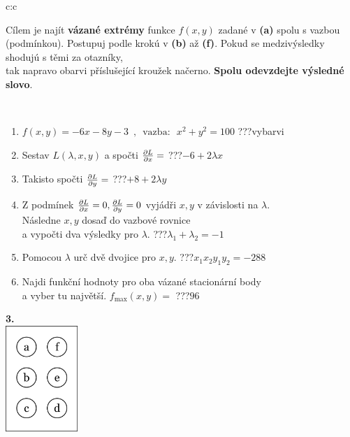 \documentclass[10pt]{report}
\begin{document}
\begin{tabular}{c:c}
\begin{minipage}[c][104.5mm][t]{0.5\linewidth}
\begin{center}
\begin{minipage}{0.95\linewidth}
\begin{center}
Cílem je najít \textbf{vázané extrémy} funkce $f(x,y)$ zadané v \textbf{(a)} spolu s vazbou (podmínkou). Postupuj podle krokú v \textbf{(b)} až \textbf{(f)}. Pokud se medzivýsledky shodujú s těmi za otazníky,\\tak napravo obarvi příslušející kroužek načerno. \textbf{Spolu odevzdejte výsledné slovo}.
\end{center}
\end{minipage}
\\[1mm]
\begin{minipage}{0.79\linewidth}
\begin{center}
\begin{varwidth}{\linewidth}
\begin{enumerate}
\normalsize
\item $f(x,y)=-6x-8y-3 \enspace , \enspace \mathrm{vazba:} \enspace x^2+y^2=100$\quad \dotfill\; ???\;\dotfill \quad vybarvi
\item Sestav $L(\lambda,x,y)$ a spočti $\pdv{L}{x}=$\quad \dotfill\; ???\;\dotfill \quad $-6+2\lambda x$
\item Takisto spočti $\pdv{L}{y}=$\quad \dotfill\; ???\;\dotfill \quad $+8+2\lambda y$
\item Z podmínek $\pdv{L}{x}=0 , \pdv{L}{y}=0$ vyjádři $x,y$ v závislosti na $\lambda$.\\ \phantom{xxxxxx}Následne $x,y$ dosaď do vazbové rovnice\\ \phantom{xxxxxx}a vypočti dva výsledky pro $\lambda$.\quad \dotfill\; ???\;\dotfill \quad $\lambda_1+\lambda_2=-1$
\item Pomocou $\lambda$ urč dvě dvojice pro $x,y$.\quad \dotfill\; ???\;\dotfill \quad $x_1 x_2 y_1 y_2=-288$
\item Najdi funkční hodnoty pro oba vázané stacionární body\\ \phantom{xxxxxx}a vyber tu najvětší. $f_{\text{max}}(x,y)=$\quad \dotfill\; ???\;\dotfill \quad $96$
\end{enumerate}
\end{varwidth}
\end{center}
\end{minipage}
\begin{minipage}{0.20\linewidth}
\begin{center}
{\Huge\bfseries 3.} \\[2mm]
\includegraphics[height=40mm]{../images/braille.png}

\end{center}
\end{minipage}
\end{center}
\end{minipage}
\end{tabular}
\end{document}
